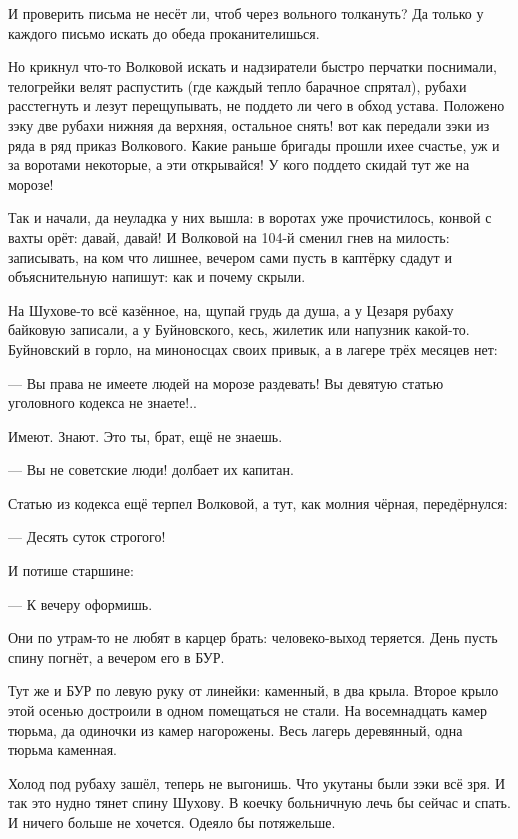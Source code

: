 И проверить \dash письма не несёт ли, чтоб через вольного толкануть? Да только у каждого письмо
искать \dash до обеда проканителишься.

Но крикнул что-то Волковой искать \dash и надзиратели быстро перчатки поснимали, телогрейки
велят распустить (где каждый тепло барачное спрятал), рубахи расстегнуть \dash и лезут
перещупывать, не поддето ли чего в обход устава. Положено зэку две рубахи \dash нижняя да
верхняя, остальное снять! \dash вот как передали зэки из ряда в ряд приказ Волкового. Какие
раньше бригады прошли \dash ихее счастье, уж и за воротами некоторые, а эти \dash открывайся! У кого
поддето \dash скидай тут же на морозе!

Так и начали, да неуладка у них вышла: в воротах уже прочистилось, конвой с вахты орёт: давай,
давай! И Волковой на 104-й сменил гнев на милость: записывать, на ком что лишнее, вечером сами
пусть в каптёрку сдадут и объяснительную напишут: как и почему скрыли.

На Шухове-то всё казённое, на, щупай \dash грудь да душа, а у Цезаря рубаху байковую записали, а у
Буйновского, кесь, жилетик или напузник какой-то. Буйновский \dash в горло, на миноносцах своих
привык, а в лагере трёх месяцев нет:

--- Вы права не имеете людей на морозе раздевать! Вы девятую статью уголовного кодекса не
знаете!..

Имеют. Знают. Это ты, брат, ещё не знаешь.

--- Вы не советские люди! \dash долбает их капитан.

Статью из кодекса ещё терпел Волковой, а тут, как молния чёрная, передёрнулся:

--- Десять суток строгого!

И потише старшине:

--- К вечеру оформишь.

Они по утрам-то не любят в карцер брать: человеко-выход теряется. День пусть спину погнёт, а
вечером его в БУР.

Тут же и БУР по левую руку от линейки: каменный, в два крыла. Второе крыло этой осенью
достроили \dash в одном помещаться не стали. На восемнадцать камер тюрьма, да одиночки из камер
нагорожены. Весь лагерь деревянный, одна тюрьма каменная.

Холод под рубаху зашёл, теперь не выгонишь. Что укутаны были зэки \dash всё зря. И так это нудно
тянет спину Шухову. В коечку больничную лечь бы сейчас \dash и спать. И ничего больше не хочется.
Одеяло бы потяжельше.

